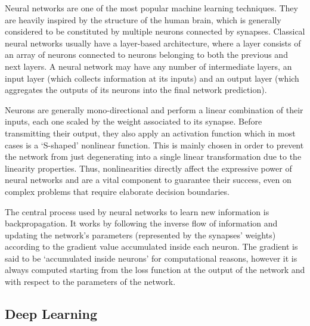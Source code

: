 Neural networks are one of the most popular machine learning techniques.
They are heavily inspired by the structure of the human brain, which is generally considered to be constituted by multiple neurons connected by synapses.
Classical neural networks usually have a layer-based architecture, where a layer consists of an array of neurons connected to neurons belonging to both the previous and next layers.
A neural network may have any number of intermediate layers, an input layer (which collects information at its inputs) and an output layer (which aggregates the outputs of its neurons into the final network prediction).

\begin{figure}[t!]
    \centering
    \quad
    \caption{}
    \label{fig:background_nn-arch_neuron}
\end{figure}

Neurons are generally mono-directional and perform a linear combination of their inputs, each one scaled by the weight associated to its synapse.
Before transmitting their output, they also apply an activation function which in most cases is a `S-shaped' nonlinear function.
This is mainly chosen in order to prevent the network from just degenerating into a single linear transformation due to the linearity properties.
Thus, nonlinearities directly affect the expressive power of neural networks and are a vital component to guarantee their success, even on complex problems that require elaborate decision boundaries.

The central process used by neural networks to learn new information is backpropagation.
It works by following the inverse flow of information and updating the network's parameters (represented by the synapses' weights) according to the gradient value accumulated inside each neuron.
The gradient is said to be `accumulated inside neurons' for computational reasons, however it is always computed starting from the loss function at the output of the network and with respect to the parameters of the network.

\subsection{Deep Learning}

